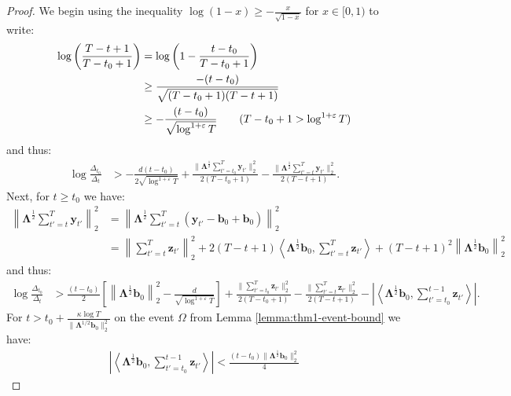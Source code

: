 \begin{proof}
We begin using the inequality $\log(1 - x) \geq -\frac{x}{\sqrt{1-x}}$ for $x \in [0,1)$ to write: 
\begin{align*}
    \log \left(\frac{T-t+1}{T-t_0+1}\right) &= \log\left(1 - \frac{t-t_0}{T-t_0+1}\right) \\
    &\geq \frac{-(t-t_0)}{\sqrt{(T-t_0+1)(T-t+1)}} \\
    &\geq -\frac{(t-t_0)}{\sqrt{\log^{1+\varepsilon} T}} \tag{$T-t_0+1 > \log^{1+\varepsilon} T$}
\end{align*}
and thus:
\begin{align*}
    \log \frac{\Delta_{t_0}}{\Delta_t} &> -\frac{d(t-t_0)}{2\sqrt{\log^{1+\varepsilon}  T}} + \frac{\lVert\boldsymbol{\Lambda}^{\frac{1}{2}} \sum_{t'=t_0}^T\mathbf{y}_{t'}\rVert_2^2}{2(T-t_0+1)}- \frac{\lVert\boldsymbol{\Lambda}^{\frac{1}{2}} \sum_{t'=t}^T\mathbf{y}_{t'}\rVert_2^2}{2(T-t+1)}.
\end{align*}
Next, for $t \geq t_0$ we have:
\begin{align*}
    \left\lVert\boldsymbol{\Lambda}^{\frac{1}{2}} \sum_{t'=t}^T\mathbf{y}_{t'}\right\rVert_2^2 &= \left\lVert\boldsymbol{\Lambda}^{\frac{1}{2}} \sum_{t'=t}^T(\mathbf{y}_{t'} - \mathbf{b}_0 + \mathbf{b}_0)\right\rVert_2^2 \\
    &= \left\lVert \sum_{t'=t}^T \mathbf{z}_{t'}\right\rVert_2^2 + 2(T-t+1) \left\langle\boldsymbol{\Lambda}^{\frac{1}{2}}\mathbf{b}_0, \sum_{t'=t}^T\mathbf{z}_{t'} \right\rangle + (T-t+1)^2\left\lVert\boldsymbol{\Lambda}^{\frac{1}{2}}\mathbf{b}_0\right\rVert_2^2 
\end{align*}
and thus:
\begin{align*}
    \log \frac{\Delta_{t_0}}{\Delta_t} &> \frac{(t-t_0)}{2}\left[\left\lVert\boldsymbol{\Lambda}^{\frac{1}{2}}\mathbf{b}_0\right\rVert_2^2 - \frac{d}{\sqrt{\log^{1+\varepsilon}  T}}\right] + \frac{\lVert\sum_{t'=t_0}^T\mathbf{z}_{t'}\rVert_2^2}{2(T-t_0+1)} - \frac{\lVert\sum_{t'=t}^T\mathbf{z}_{t'}\rVert_2^2}{2(T-t+1)} - \left| \left\langle\boldsymbol{\Lambda}^{\frac{1}{2}}\mathbf{b}_0, \sum_{t'=t_0}^{t-1}\mathbf{z}_{t'} \right\rangle\right|. 
\end{align*}
For $t > t_0 + \frac{\kappa \log T}{\lVert\boldsymbol{\Lambda}^{1/2}\mathbf{b}_0\rVert^2_2}$ on the event $\Omega$ from Lemma \ref{lemma:thm1-event-bound} we have:
\begin{align*}
    \left|\left\langle\boldsymbol{\Lambda}^{\frac{1}{2}}\mathbf{b}_0, \sum_{t'=t_0}^{t-1}\mathbf{z}_{t'} \right\rangle\right| < \frac{(t-t_0) \lVert\boldsymbol{\Lambda}^{\frac{1}{2}} \mathbf{b}_0\rVert_2^2}{4}

\end{align*}
\end{proof}
